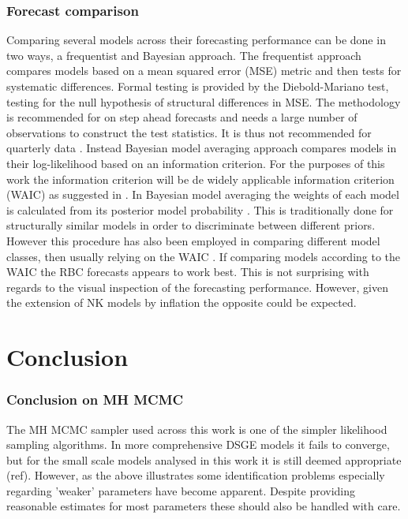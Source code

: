 \documentclass[12pt,a4paper,english]{article} %
\let\oldsection\section
\renewcommand\section{\clearpage\oldsection}
\begin{document}
	\subsubsection{Forecast comparison}
	Comparing several models across their forecasting performance can be done in two ways, a frequentist and Bayesian approach.
	The frequentist approach compares models based on a mean squared error (MSE) metric and then tests for systematic differences. Formal testing is provided by the Diebold-Mariano test, testing for the null hypothesis of structural differences in MSE. The methodology is recommended for on step ahead forecasts and needs a large number of observations to construct the test statistics. It is thus not recommended for quarterly data \cite{chin_bayesian_2019}.
	Instead Bayesian model averaging approach compares models in their log-likelihood based on an information criterion. For the purposes of this work the information criterion will be de widely applicable information criterion (WAIC) as suggested in \cite{chin_bayesian_2019}. In Bayesian model averaging the weights of each model is calculated from its posterior model probability \cite{chin_bayesian_2019}. This is traditionally done for structurally similar models in order to discriminate between different priors. However this procedure has also been employed in comparing different model classes, then usually relying on the WAIC \cite{chin_bayesian_2019}.
	If comparing models according to the WAIC the RBC forecasts appears to work best. This is not surprising with regards to the visual inspection of the forecasting performance. However, given the extension of NK models by inflation the opposite could be expected.
	
	\section{Conclusion}
	\subsubsection{Conclusion on MH MCMC}
	The MH MCMC sampler used across this work is one of the simpler likelihood sampling algorithms. In more comprehensive DSGE models it fails to converge, but for the small scale models analysed in this work it is still deemed appropriate (ref). However, as the above illustrates some identification problems especially regarding 'weaker' parameters have become apparent. Despite providing reasonable estimates for most parameters these should also be handled with care. 
	
\end{document}
